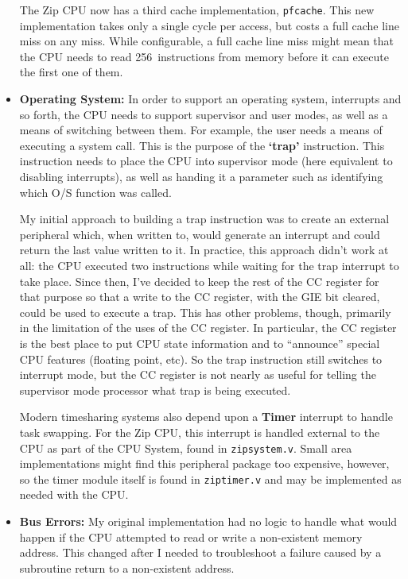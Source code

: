 \documentclass{gqtekspec}
\begin{document}
\begin{itemize}
	The Zip CPU now has a third cache implementation, {\tt pfcache}.  This
	new implementation takes only a single cycle per access, but costs a
	full cache line miss on any miss.  While configurable, a full cache
	line miss might mean that the CPU needs to read 256~instructions from
	memory before it can execute the first one of them.

\item {\bf Operating System:} In order to support an operating system,
	interrupts and so forth, the CPU needs to support supervisor and
	user modes, as well as a means of switching between them.  For example,
	the user needs a means of executing a system call.  This is the 
	purpose of the {\bf `trap'} instruction.  This instruction needs to
	place the CPU into supervisor mode (here equivalent to disabling
	interrupts), as well as handing it a parameter such as identifying
	which O/S function was called. 

	My initial approach to building a trap instruction was to create an
	external peripheral which, when written to, would generate an
	interrupt and could return the last value written to it.  In practice,
	this approach didn't work at all: the CPU executed two instructions
	while waiting for the trap interrupt to take place.  Since then, I've
	decided to keep the rest of the CC register for that purpose so that
	a write to the CC register, with the GIE bit cleared, could be used
	to execute a trap.  This has other problems, though, primarily in the
	limitation of the uses of the CC register.  In particular, the CC
	register is the best place to put CPU state information and to
	``announce'' special CPU features (floating point, etc).  So the trap
	instruction still switches to interrupt mode, but the CC register is not
	nearly as useful for telling the supervisor mode processor what trap
	is being executed.

	Modern timesharing systems also depend upon a {\bf Timer} interrupt
	to handle task swapping.  For the Zip CPU, this interrupt is handled
	external to the CPU as part of the CPU System, found in
	{\tt zipsystem.v}.  Small area implementations might find this
	peripheral package too expensive, however, so the timer module itself
	is found in {\tt ziptimer.v} and may be implemented as needed with
	the CPU.

\item {\bf Bus Errors:} My original implementation had no logic to handle
	what would happen if the CPU attempted to read or write a non-existent
	memory address.  This changed after I needed to troubleshoot a failure
	caused by a subroutine return to a non-existent address.


\end{itemize}
\end{document}
